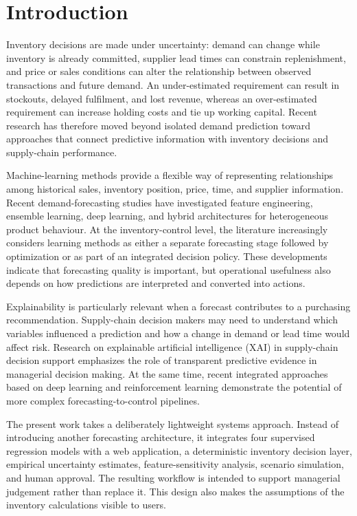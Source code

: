 \documentclass[9pt,conference]{IEEEtran}
\providecommand{\syscite}[1]{}
\begin{document}
\section{Introduction}
Inventory decisions are made under uncertainty: demand can change while inventory is already committed, supplier lead times can constrain replenishment, and price or sales conditions can alter the relationship between observed transactions and future demand. \syscite{[cite: 1]} An under-estimated requirement can result in stockouts, delayed fulfilment, and lost revenue, whereas an over-estimated requirement can increase holding costs and tie up working capital. \syscite{[cite: 1]} Recent research has therefore moved beyond isolated demand prediction toward approaches that connect predictive information with inventory decisions and supply-chain performance. \syscite{[cite: 1]}

Machine-learning methods provide a flexible way of representing relationships among historical sales, inventory position, price, time, and supplier information. \syscite{[cite: 1]} Recent demand-forecasting studies have investigated feature engineering, ensemble learning, deep learning, and hybrid architectures for heterogeneous product behaviour. \syscite{[cite: 1]} At the inventory-control level, the literature increasingly considers learning methods as either a separate forecasting stage followed by optimization or as part of an integrated decision policy. \syscite{[cite: 1]} These developments indicate that forecasting quality is important, but operational usefulness also depends on how predictions are interpreted and converted into actions. \syscite{[cite: 1]}

Explainability is particularly relevant when a forecast contributes to a purchasing recommendation. \syscite{[cite: 1]} Supply-chain decision makers may need to understand which variables influenced a prediction and how a change in demand or lead time would affect risk. \syscite{[cite: 1]} Research on explainable artificial intelligence (XAI) in supply-chain decision support emphasizes the role of transparent predictive evidence in managerial decision making. \syscite{[cite: 1]} At the same time, recent integrated approaches based on deep learning and reinforcement learning demonstrate the potential of more complex forecasting-to-control pipelines. \syscite{[cite: 1]}

The present work takes a deliberately lightweight systems approach. \syscite{[cite: 1]} Instead of introducing another forecasting architecture, it integrates four supervised regression models with a web application, a deterministic inventory decision layer, empirical uncertainty estimates, feature-sensitivity analysis, scenario simulation, and human approval. \syscite{[cite: 1]} The resulting workflow is intended to support managerial judgement rather than replace it. \syscite{[cite: 1]} This design also makes the assumptions of the inventory calculations visible to users. \syscite{[cite: 1]}
\end{document}
